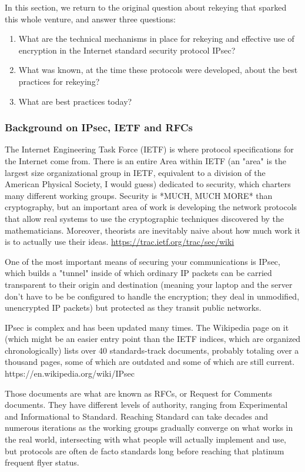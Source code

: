 \documentclass[%
 aip,
 jmp,%
 amsmath,amssymb,
 reprint,%
]{revtex4-1}
\begin{document}
In this section, we return to the original question about rekeying
that sparked this whole venture, and answer three questions:

\begin{enumerate}
\item What are the technical mechanisms in place for rekeying and
   effective use of encryption in the Internet standard security
   protocol IPsec?
\item What was known, at the time these protocols were developed, about
   the best practices for rekeying?
\item What are best practices today?
\end{enumerate}

\subsubsection{Background on IPsec, IETF and RFCs}

The Internet Engineering Task Force (IETF) is where protocol
specifications for the Internet come from.  There is an entire Area
within IETF (an "area" is the largest size organizational group in
IETF, equivalent to a division of the American Physical Society, I
would guess) dedicated to security, which charters many different
working groups.  Security is *MUCH, MUCH MORE* than cryptography, but
an important area of work is developing the network protocols that
allow real systems to use the cryptographic techniques discovered by
the mathematicians.  Moreover, theorists are inevitably naive about
how much work it is to actually use their ideas.
\url{https://trac.ietf.org/trac/sec/wiki}

One of the most important means of securing your communications is
IPsec, which builds a "tunnel" inside of which ordinary IP packets can
be carried transparent to their origin and destination (meaning your
laptop and the server don't have to be be configured to handle the
encryption; they deal in unmodified, unencrypted IP packets) but
protected as they transit public networks.

IPsec is complex and has been updated many times.  The Wikipedia page
on it (which might be an easier entry point than the IETF indices,
which are organized chronologically) lists over 40 standards-track
documents, probably totaling over a thousand pages, some of which are
outdated and some of which are still current.
https://en.wikipedia.org/wiki/IPsec

Those documents are what are known as RFCs, or Request for Comments
documents.  They have different levels of authority, ranging from
Experimental and Informational to Standard.  Reaching Standard can
take decades and numerous iterations as the working groups gradually
converge on what works in the real world, intersecting with what
people will actually implement and use, but protocols are often de
facto standards long before reaching that platinum frequent flyer
status.
\end{document}

